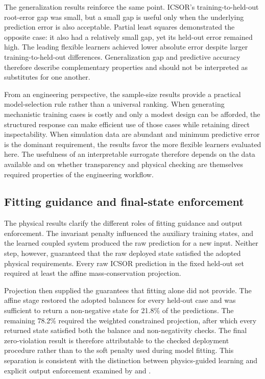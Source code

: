 The generalization results reinforce the same point. ICSOR's training-to-held-out root-error gap was small, but a small gap is useful only when the underlying prediction error is also acceptable. Partial least squares demonstrated the opposite case: it also had a relatively small gap, yet its held-out error remained high. The leading flexible learners achieved lower absolute error despite larger training-to-held-out differences. Generalization gap and predictive accuracy therefore describe complementary properties and should not be interpreted as substitutes for one another.

From an engineering perspective, the sample-size results provide a practical model-selection rule rather than a universal ranking. When generating mechanistic training cases is costly and only a modest design can be afforded, the structured response can make efficient use of those cases while retaining direct inspectability. When simulation data are abundant and minimum predictive error is the dominant requirement, the results favor the more flexible learners evaluated here. The usefulness of an interpretable surrogate therefore depends on the data available and on whether transparency and physical checking are themselves required properties of the engineering workflow.

\subsection{Fitting guidance and final-state enforcement}

The physical results clarify the different roles of fitting guidance and output enforcement. The invariant penalty influenced the auxiliary training states, and the learned coupled system produced the raw prediction for a new input. Neither step, however, guaranteed that the raw deployed state satisfied the adopted physical requirements. Every raw ICSOR prediction in the fixed held-out set required at least the affine mass-conservation projection.

Projection then supplied the guarantees that fitting alone did not provide. The affine stage restored the adopted balances for every held-out case and was sufficient to return a non-negative state for 21.8\% of the predictions. The remaining 78.2\% required the weighted constrained projection, after which every returned state satisfied both the balance and non-negativity checks. The final zero-violation result is therefore attributable to the checked deployment procedure rather than to the soft penalty used during model fitting. This separation is consistent with the distinction between physics-guided learning and explicit output enforcement examined by \citet{Hansen2024} and \citet{KircherVotsmeier2025}.

